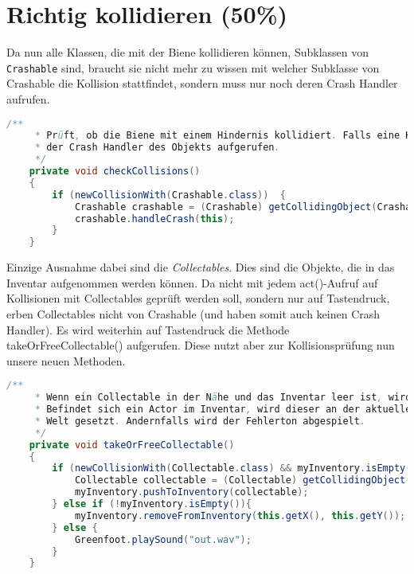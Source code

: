 \documentclass{pi1}
\begin{document}
\section{Richtig kollidieren (50\%)}

Da nun alle Klassen, die mit der Biene kollidieren können, Subklassen von \texttt{Crashable} sind, braucht sie nicht mehr zu wissen mit welcher Subklasse von Crashable die Kollision stattfindet, sondern muss nur noch deren Crash Handler aufrufen.

\begin{lstlisting}[caption={\emph{checkCollisions()}-Methode}, firstnumber=156, language=Java]
/**
     * Prüft, ob die Biene mit einem Hindernis kollidiert. Falls eine Kollision stattfindet, wird
     * der Crash Handler des Objekts aufgerufen.
     */
    private void checkCollisions()
    {
        if (newCollisionWith(Crashable.class))  {
            Crashable crashable = (Crashable) getCollidingObject(Crashable.class);
            crashable.handleCrash(this);
        }
    }
\end{lstlisting}

Einzige Ausnahme dabei sind die \emph{Collectables}. Dies sind die Objekte, die in das Inventar aufgenommen werden können. Da nicht mit jedem act()-Aufruf auf Kollisionen mit Collectables geprüft werden soll, sondern nur auf Tastendruck, erben Collectables nicht von Crashable (und haben somit auch keinen Crash Handler). Es wird weiterhin auf Tastendruck die Methode takeOrFreeCollectable() aufgerufen. Diese nutzt aber zur Kollisionsprüfung nun unsere neuen Methoden.

\begin{lstlisting}[caption={\emph{takeOrFreeCollectable()}-Methode}, firstnumber=168, language=Java]
/**
     * Wenn ein Collectable in der Nähe und das Inventar leer ist, wird das Collectable eingesammelt.
     * Befindet sich ein Actor im Inventar, wird dieser an der aktuellen Position der Biene in die
     * Welt gesetzt. Andernfalls wird der Fehlerton abgespielt.
     */
    private void takeOrFreeCollectable()
    {
        if (newCollisionWith(Collectable.class) && myInventory.isEmpty() ){
            Collectable collectable = (Collectable) getCollidingObject(Collectable.class);
            myInventory.pushToInventory(collectable);
        } else if (!myInventory.isEmpty()){
            myInventory.removeFromInventory(this.getX(), this.getY());
        } else {
            Greenfoot.playSound("out.wav");
        }
    }
\end{lstlisting}
\end{document}
